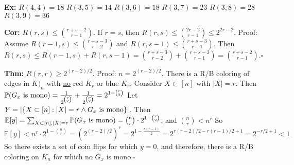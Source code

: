 \documentclass[10pt,letterpaper]{article}
\newcommand{\n}{\hfill\break}
\newcommand{\thm}[1]{\par\noindent\settowidth{\hangindent}{\textbf{Thm: }}\textbf{Thm: }#1\n}
\newcommand{\cor}[1]{\par\noindent\settowidth{\hangindent}{\textbf{Cor: }}\textbf{Cor: }#1\n}
\newcommand{\ex}[1]{\par\noindent\settowidth{\hangindent}{\textbf{Ex: }}\textbf{Ex: }#1\n}
\newcommand{\proven}{\;$\square$\n}
\newcommand{\ptxt}[1]{\textrm{\textnormal{#1}}}
\newcommand{\card}[1]{\left|#1\right|}
\newcommand{\set}[1]{\left\{#1\right\}}
\newcommand{\Prob}{\mathbb{P}}
\newcommand{\Avg}{\mathbb{E}}
\begin{document}
\ex{$R(4,4)=18$\n
$R(3,5)=14$\n
$R(3,6)=18$\n
$R(3,7)=23$\n
$R(3,8)=28$\n
$R(3,9)=36$\n}

\cor{$R(r,s)\le\binom{r+s-2}{r-1}$. If $r=s$, then $R(r,s)\le\binom{2r-2}{r-1}\le{}2^{2r-2}$.\n
Proof: Assume $R(r-1,s)\le\binom{r+s-3}{r-2}$ and $R(r,s-1)\le\binom{r+s-3}{r-1}$.\n
Then $R(r,s)\le{}R(r-1,s)+R(r,s-1)=\binom{r+s-3}{r-2}+\binom{r+s-3}{r-1}=\binom{r+s-2}{r-1}$.\proven}

\thm{$R(r,r)\ge{}2^{(r-2)/2}$.\n
Proof: $n=2^{(r-2)/2}$. There is a R/B coloring of edges in $K)_{n}$ with \underline{no} red $K_{r}$ or blue $K_{r}$. Consider $X\subset[n]$ with $\card{X}=r$. Then $\Prob(G_{x}\ptxt{ is mono})=\frac{1}{2^{\binom{r}{2}}}+\frac{1}{2^{\binom{r}{2}}}=2^{1-\binom{r}{2}}$\n
Let $Y=\card{\set{X\subset[n]:\card{X}=r\land{}G_{x}\ptxt{ is mono}}}$.\n
Then $\Avg[y]=\sum_{X\subset[n],\card{X}=r}\Prob(G_{x}\ptxt{ is mono})=\binom{n}{r}\cdot{}2^{1-\binom{r}{2}}$, and $\binom{n}{r}<n^{r}$\n
So $\Avg[y]<n^{r}\cdot{}2^{1-\binom{n}{r}}=\left(2^{(r-2)/2}\right)^{r}=2^{1-\frac{r(r-1)}{2}}=2^{r(r-2)/2-r(r-1)/2+1}=2^{-r/2+1}<1$\n
So there exists a set of coin flips for which $y=0$, and therefore, there is a R/B coloring on $K_{n}$ for which no $G_{x}$ is mono.\proven}
\end{document}
